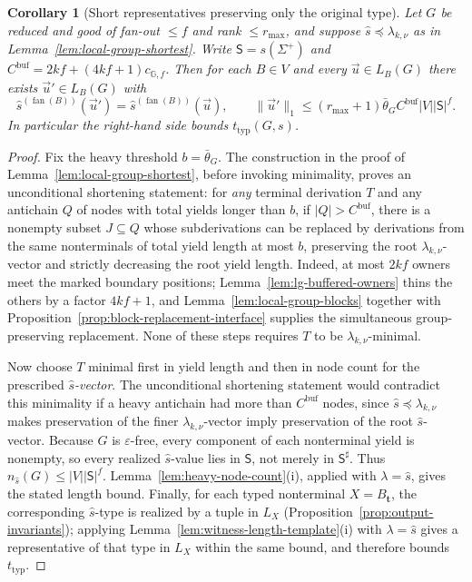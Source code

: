 \documentclass[11pt]{article}
\numberwithin{equation}{section}
\theoremstyle{plain}
\newtheorem{corollary}[theorem]{Corollary}
\theoremstyle{definition}
\theoremstyle{remark}
\newcommand{\tuple}[1]{\vec{#1}}
\newcommand{\eps}{\varepsilon}
\newcommand{\fan}{\operatorname{fan}}
\theoremstyle{plain}
\begin{document}
\begin{corollary}[Short representatives preserving only the original type]
\label{cor:lg-type-level-shortest}
Let $G$ be reduced and good of fan-out $\le f$ and rank $\le r_{\max}$,
and suppose $\widehat s\preceq\lambda_{k,\nu}$ as in
Lemma~\ref{lem:local-group-shortest}.  Write $\mathsf S=s(\Sigma^+)$ and
$C^{\mathrm{buf}}=2kf+(4kf+1)c_{{\mathbb G},f}$.  Then for each $B\in V$
and every $\tuple u\in L_B(G)$ there exists $\tuple u'\in L_B(G)$ with
\[
 \widehat s^{(\fan(B))}(\tuple u')=
 \widehat s^{(\fan(B))}(\tuple u),\qquad
 \|\tuple u'\|_1\le
 (r_{\max}+1)\bar\theta_G C^{\mathrm{buf}}|V||\mathsf S|^f.
\]
In particular the right-hand side bounds $t_{\mathrm{typ}}(G,s)$.
\end{corollary}

\begin{proof}
Fix the heavy threshold $b=\bar\theta_G$.  The construction in the proof of
Lemma~\ref{lem:local-group-shortest}, before invoking minimality, proves an
unconditional shortening statement: for \emph{any} terminal derivation
$T$ and any antichain $Q$ of nodes with total yields longer than $b$,
if $|Q|>C^{\mathrm{buf}}$, there is a nonempty subset $J\subseteq Q$
whose subderivations can be replaced by derivations from the same
nonterminals of total yield length at most $b$, preserving the root
$\lambda_{k,\nu}$-vector and strictly decreasing the root yield length.
Indeed, at most $2kf$ owners meet the marked boundary positions;
Lemma~\ref{lem:lg-buffered-owners} thins the others by a factor
$4kf+1$, and Lemma~\ref{lem:local-group-blocks} together with
Proposition~\ref{prop:block-replacement-interface} supplies the
simultaneous group-preserving replacement.  None of these steps requires
$T$ to be $\lambda_{k,\nu}$-minimal.

Now choose $T$ minimal first in yield length and then in node count
for the prescribed \emph{$\widehat s$-vector}.  The unconditional shortening
statement would contradict this minimality if a heavy antichain had more than
$C^{\mathrm{buf}}$ nodes, since
$\widehat s\preceq\lambda_{k,\nu}$ makes preservation of the finer
$\lambda_{k,\nu}$-vector imply preservation of the root
$\widehat s$-vector.  Because $G$ is $\eps$-free, every component of each
nonterminal yield is nonempty, so every realized $\widehat s$-value lies
in $\mathsf S$, not merely in $\mathsf S^\sharp$.  Thus
$n_{\widehat s}(G)\le|V||\mathsf S|^f$.
Lemma~\ref{lem:heavy-node-count}(i), applied with
$\lambda=\widehat s$, gives the stated length bound.
Finally, for each typed nonterminal $X=B_{\mathbf t}$, the
corresponding $\widehat s$-type is realized by a tuple in $L_X$
(Proposition~\ref{prop:output-invariants}); applying
Lemma~\ref{lem:witness-length-template}(i) with
$\lambda=\widehat s$ gives a representative of that type in $L_X$
within the same bound, and therefore bounds $t_{\mathrm{typ}}$.
\end{proof}
\end{document}
